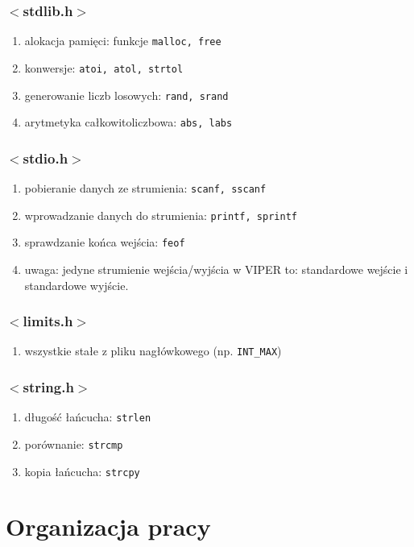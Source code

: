 \documentclass[a4paper,twoside,openright,11pt]{report}
\begin{document}
  \subsection {$<$stdlib.h$>$}
    \begin{enumerate}
      \item alokacja pamięci: funkcje \texttt{malloc, free}
      \item konwersje: \texttt{atoi, atol, strtol}
      \item generowanie liczb losowych: \texttt{rand, srand}
      \item arytmetyka całkowitoliczbowa: \texttt{abs, labs}
    \end{enumerate}
  \subsection {$<$stdio.h$>$}
    \begin{enumerate}
      \item pobieranie danych ze strumienia: \texttt{scanf, sscanf}
      \item wprowadzanie danych do strumienia: \texttt{printf, sprintf}
      \item sprawdzanie końca wejścia: \texttt{feof}
      \item uwaga: jedyne strumienie wejścia/wyjścia w VIPER to: standardowe wejście i standardowe wyjście.
    \end{enumerate}
  \subsection {$<$limits.h$>$}
    \begin{enumerate}
      \item wszystkie stałe z pliku nagłówkowego (np. \texttt{INT\_MAX})
    \end{enumerate}
  \subsection {$<$string.h$>$}
    \begin{enumerate}
      \item długość łańcucha: \texttt{strlen}
      \item porównanie: \texttt{strcmp}
      \item kopia łańcucha: \texttt{strcpy}
    \end{enumerate}

  \chapter {Organizacja pracy}
\end{document}
